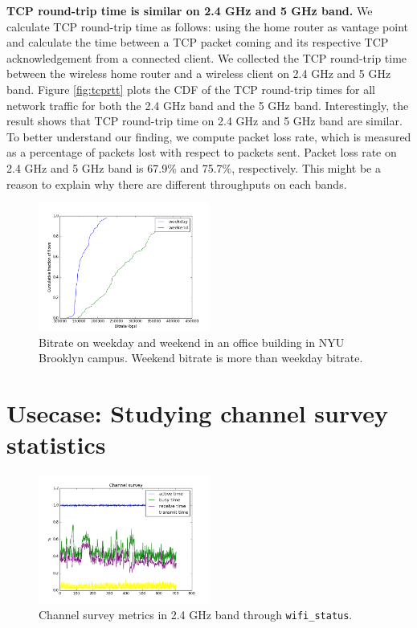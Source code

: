\textbf{TCP round-trip time is similar on 2.4 GHz and 5 GHz band.} We calculate TCP round-trip time as follows: using the home router as vantage point and calculate the time between a TCP packet coming and its respective TCP acknowledgement from a connected client. We collected the TCP round-trip time between the wireless home router and a wireless client on 2.4 GHz and 5 GHz band. Figure \ref{fig:tcprtt} plots the CDF of the TCP round-trip times for all network traffic for both the 2.4 GHz band and the 5 GHz band. Interestingly, the result shows that TCP round-trip time on 2.4 GHz and 5 GHz band are similar. To better understand our finding, we compute packet loss rate, which is measured as a percentage of packets lost with respect to packets sent. Packet loss rate on 2.4 GHz and 5 GHz band is 67.9\% and 75.7\%, respectively. This might be a reason to explain why there are different throughputs on each bands.  

\begin{figure}
\centering
\includegraphics[width=0.5\textwidth]{figure/bitrate(weekday_vs_weekend).png}
\caption{Bitrate on weekday and weekend in an office building in NYU Brooklyn campus. Weekend bitrate is more than weekday bitrate.} 
\label{fig:compare}
\end{figure}  

\section{Usecase: Studying channel survey statistics}
\label{sec.usecase2}

\begin{figure}
\centering
\includegraphics[width=0.5\textwidth]{figure/channel.png}
\caption{Channel survey metrics in 2.4 GHz band through \texttt{wifi\_status}.} 
\label{fig:channelsurvey}
\end{figure}

